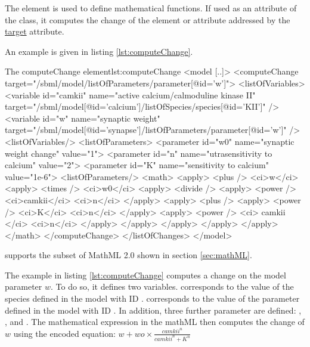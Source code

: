 The  element is used to define mathematical functions. 
If used as an attribute of the  class, it computes the change of the element or attribute addressed by the \hyperref[sec:target]{target} attribute.

An example is given in listing \ref{lst:computeChange}.
%
\begin{myXmlLst}{The computeChange element}{lst:computeChange}
<model [..]>
    <computeChange target="/sbml/model/listOfParameters/parameter[@id='w']">
      <listOfVariables>
        <variable id="camkii" name="active calcium/calmoduline kinase II" 
                  target="/sbml/model[@id='calcium']/listOfSpecies/species[@id='KII']" />
        <variable id="w" name="synaptic weight"
                  target="/sbml/model[@id='synapse']/listOfParameters/parameter[@id='w']" />
      <listOfVariables/>
      <listOfParameters>
        <parameter id="w0" name="synaptic weight change" value="1">
        <parameter id="n" name="utrasensitivity to calcium" value="2">
        <parameter id="K" name="sensitivity to calcium" value="1e-6">
      <listOfParameters/>
      <math>
         <apply>
           <plus />
           <ci>w</ci>
           <apply>
             <times />
             <ci>w0</ci>
             <apply>
               <divide />
               <apply>
                 <power />
                 <ci>camkii</ci>
                 <ci>n</ci>
               </apply>
               <apply>
                 <plus />
                 <apply>
                   <power />
                   <ci>K</ci>
                   <ci>n</ci>
                 </apply>
                 <apply>
                   <power />
                   <ci> camkii </ci>
                   <ci>n</ci>
                 </apply>
               </apply>
             </apply>
           </apply> 
         </apply>
      </math>
    </computeChange>
  </listOfChanges>
</model>
\end{myXmlLst}

\LoneVone supports the subset of MathML 2.0 shown in section \ref{sec:mathML}.
%

The example in listing \ref{lst:computeChange} computes a change on the model parameter $w$. To do so, it defines two variables.  corresponds to the value of the species  defined in the model with ID .  corresponds to the value of the parameter  defined in the model with ID . 
In addition, three further parameter are defined: , , and .
The mathematical expression in the mathML then computes the change of $w$ using the encoded equation:
\begin{math}

w + wo \times \frac{camkii^{n}}{camkii^{n}+K^{n}}

\end{math}



